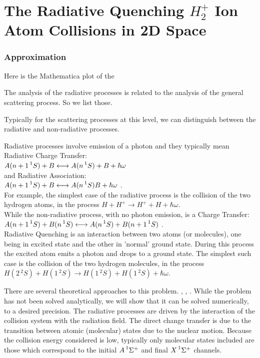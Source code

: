 \chapter{The Radiative Quenching \texorpdfstring{$ H_2^+ $}{$H_2^+$}  Ion Atom Collisions in 2D Space} 
\label{chp:quenching}

\subsection{Approximation}

Here is the Mathematica plot of the 




The analysis of the radiative processes is related to the analysis of the general scattering process. So we list those.

Typically for the scattering processes at this level, we can distinguish between the radiative and non-radiative processes. 

Radiative processes involve emission of a photon and they typically mean Radiative Charge Transfer: \\
$ A(n+1\prescript{1}{}S) + B \longleftrightarrow A(n\prescript{1}{}S) + B + \hbar\omega $ \\
and Radiative Association: \\
$ A(n+1\prescript{1}{}S) + B \longleftrightarrow A(n\prescript{1}{}S)B + \hbar\omega $ .\\
For example, the simplest case of the radiative process is the collision of the two hydrogen atoms, in the process $ H + H^+ \rightarrow H^+ + H + \hbar\omega $.\\

While the non-radiative process, with no photon emission, is a Charge Transfer: \\
$ A(n+1\prescript{1}{}S) + B(n\prescript{1}{}S) \longleftrightarrow  A(n\prescript{1}{}S) + B(n+1\prescript{1}{}S) $ .\\

Radiative Quenching is an interaction between two atoms (or molecules), one being in excited state and the other in 'normal' ground state. During this process the excited atom emits a photon and drops to a ground state.
The simplest such case is the collision of the two hydrogen molecules, in the process $ H(2\,{}^2\!S) + H(1\,{}^2\!S) \rightarrow H(1\,{}^2\!S) + H(1\,{}^2\!S) + \hbar\omega $.

There are several theoretical approaches to this problem. \cite{RadQuench1}, \cite{RadQuench2}, \cite{Zygelman88}. While the problem has not been solved analytically, we will show that it can be solved numerically, to a desired precision. The radiative processes are driven by the interaction of the collision system with the radiation field. The direct change transfer is due to the transition between atomic (molecular) states due to the nuclear motion. Because the collision energy considered is low, typically only molecular states included are those which correspond to the initial $ A \prescript{1}{}\Sigma^+ $  and final $ X \prescript{1}{}\Sigma^+ $ channels.

